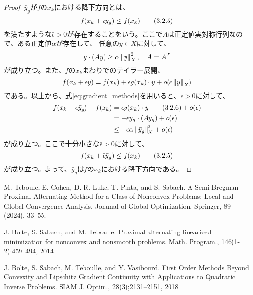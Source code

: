 \documentclass[a4paper,11pt]{jsarticle}
\theoremstyle{definition}
\newcommand{\Norm}[1]{\left\lVert {#1} \right\rVert} %
\begin{document}
\begin{proof}
  $\bar{y}_{g}$が$f$の$x_{k}$における降下方向とは、
  \begin{equation}
    \label{eq:descent_direction}
    f(x_k + \bar{\epsilon} \bar{y}_{g}) \leq f(x_k) \tag{3.2.5} \notag
  \end{equation}
  を満たすような$\bar{\epsilon} > 0$が存在することをいう。ここで$A$は正定値実対称行列なので、ある正定値$\alpha$が存在して、
  任意の$y \in X$に対して、
  \begin{equation}
    \label{eq:descent_direction_2}
    y \cdot (Ay) \geq \alpha \Norm{y}^{2}_{X}, \quad A = A^{T} \notag
  \end{equation}
  が成り立つ。また、$f$の$x_k$まわりでのテイラー展開、
  \begin{equation}
    \label{eq:descent_direction_2}
    f(x_k + \epsilon y) = f(x_k) + \epsilon g(x_k) \cdot  y + o(\epsilon\Norm{y}_{X}) \notag
  \end{equation}
  である。以上から、式\eqref{eq:gradient_methods}を用いると、$\epsilon > 0$に対して、
  \begin{align}
    \label{eq:descent_direction_3}
    f(x_k + \epsilon \bar{y}_{g}) - f(x_k) & = \epsilon g(x_k) \cdot  y  \tag{3.2.6} + o(\epsilon) \notag         \\
                                           & = - \epsilon \bar{y}_g \cdot (A\bar{y}_g) + o(\epsilon) \notag       \\
                                           & \leq - \epsilon \alpha \Norm{\bar{y}_g}^{2}_{X} + o(\epsilon) \notag
  \end{align}
  が成り立つ。ここで十分小さな$\bar{\epsilon} > 0$に対して、
  \begin{equation}
    \label{eq:descent_direction}
    f(x_k + \bar{\epsilon} \bar{y}_{g}) \leq f(x_k) \tag{3.2.5} \notag
  \end{equation}
  が成り立つ。よって、$\bar{y}_{g}$は$f$の$x_{k}$における降下方向である。
\end{proof}

\begin{thebibliography}{99}
  M. Teboule, E. Cohen, D. R. Luke, T. Pinta, and S. Sabach.
  A Semi-Bregman Proximal Alternating Method for a Class of Nonconvex Problems: Local and Global Convergence Analysis.
  Jonunal of Global Optimization, Springer, 89 (2024), 33--55.

  J. Bolte, S. Sabach, and M. Teboulle.
  Proximal alternating linearized minimization for nonconvex and nonsmooth problems.
  Math. Program., 146(1-2):459--494, 2014.

  J. Bolte, S. Sabach, M. Teboulle, and Y. Vasibourd.
  First Order Methods Beyond Convexity and Lipschitz Gradient Continuity with Applications to Quadratic Inverse Problems.
  SIAM J. Optim., 28(3);2131--2151, 2018

\end{thebibliography}
\end{document}
